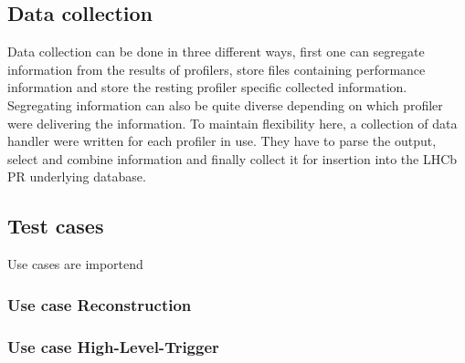 \documentclass[a4paper]{jpconf}
\begin{document}
\subsection{Data collection}
\label{sec:data_collection}

Data collection can be done in three different ways, first one can segregate information from the results of profilers, store files containing performance information and store the resting profiler specific collected information. Segregating information can also be quite diverse depending on which profiler were delivering the information. To maintain flexibility here, a collection of data handler were written for each profiler in use. They have to parse the output, select and combine information and finally collect it for insertion into the LHCb PR underlying database.  

\subsection{Test cases}
\label{sec:test_cases}

Use cases are importend 

\subsubsection{Use case Reconstruction}
\label{sec:use_case_rec}

\subsubsection{Use case High-Level-Trigger}
\label{sec:use_case_hlt}
\end{document}
